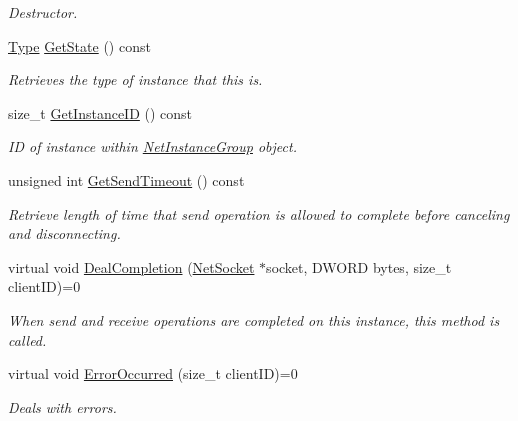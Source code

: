 \begin{DoxyCompactItemize}
\begin{DoxyCompactList}\small\item\em Destructor. \item\end{DoxyCompactList}\item 
\hyperlink{class_net_instance_a0ec01a76d9b78794cfbdeab10a436cdc}{Type} \hyperlink{class_net_instance_a5dc12b39b45ca3511fca4e693d6f0038}{GetState} () const 
\begin{DoxyCompactList}\small\item\em Retrieves the type of instance that this is. \item\end{DoxyCompactList}\item 
size\_\-t \hyperlink{class_net_instance_a77155b3764ea62c4b5d1979540915539}{GetInstanceID} () const 
\begin{DoxyCompactList}\small\item\em ID of instance within \hyperlink{class_net_instance_group}{NetInstanceGroup} object. \item\end{DoxyCompactList}\item 
unsigned int \hyperlink{class_net_instance_a34536f0fde1de8e8e1ad6c3890cd7128}{GetSendTimeout} () const 
\begin{DoxyCompactList}\small\item\em Retrieve length of time that send operation is allowed to complete before canceling and disconnecting. \item\end{DoxyCompactList}\item 
virtual void \hyperlink{class_net_instance_a77a9c992d7ab0b023de51470a3392c49}{DealCompletion} (\hyperlink{class_net_socket}{NetSocket} $\ast$socket, DWORD bytes, size\_\-t clientID)=0
\begin{DoxyCompactList}\small\item\em When send and receive operations are completed on this instance, this method is called. \item\end{DoxyCompactList}\item 
virtual void \hyperlink{class_net_instance_ab3369f37337a9de2cbefe92f0bf1d087}{ErrorOccurred} (size\_\-t clientID)=0
\begin{DoxyCompactList}\small\item\em Deals with errors. \item\end{DoxyCompactList}\item 

\end{DoxyCompactItemize}

